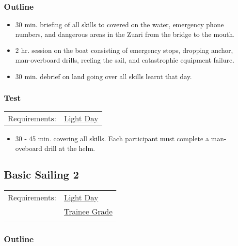 \documentclass[12pt]{scrartcl}
\begin{document}
\subsubsection{Outline} \label{subsubsec:safety procedures:outline}

\begin{itemize}
	\item 30 min. briefing of all skills to covered on the water, emergency phone numbers, and dangerous areas in the Zuari from the bridge to the mouth.
	\item 2 hr. session on the boat consisting of emergency stops, dropping anchor, man-overboard drills, reefing the sail, and catastrophic equipment failure.
	\item 30 min. debrief on land going over all skills learnt that day.
\end{itemize}

\subsubsection{Test} \label{subsubsec:safety procedures:test}

\label{tab:safety procedures:test:requirements}
\begin{tabular}{ll}
	Requirements: & \hyperlink{condition:light day}{Light Day} \\
\end{tabular}

\begin{itemize}
	\item 30 - 45 min. covering all skills. Each participant must complete a man-oveboard drill at the helm.
\end{itemize}

\subsection{Basic Sailing 2} \label{subsec:basic sailing 2}

\label{tab:basic sailing 2:requirements}
\begin{tabular}{ll}
	Requirements: & \hyperlink{condtion:light day}{Light Day} \\
	& \hyperlink{grade:trainee}{Trainee Grade} \\
	& \nameref{subsec:safety procedures} \\
\end{tabular}

\subsubsection{Outline} \label{subsubsec:basic sailing 2:outline}
\end{document}
